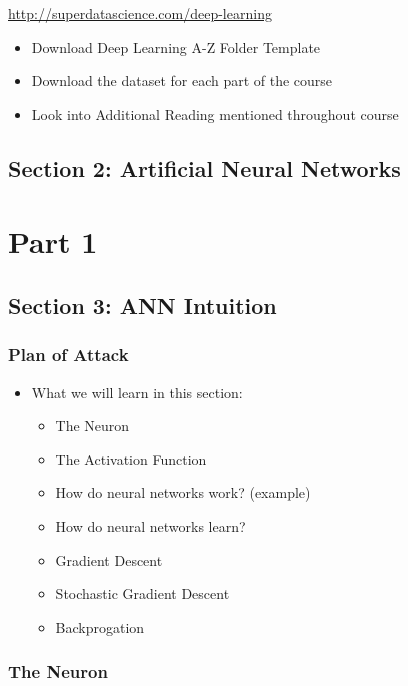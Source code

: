 \documentclass[11pt]{article}
\begin{document}
\url{http://superdatascience.com/deep-learning}

\begin{itemize}
\item Download Deep Learning A-Z Folder Template
\item Download the dataset for each part of the course
\item Look into Additional Reading mentioned throughout course
\end{itemize}

\subsection{Section 2: Artificial Neural Networks}
\label{sec:orgb8c7546}

\section{Part 1}
\label{sec:org360414c}

\subsection{Section 3: ANN Intuition}
\label{sec:orgaba52d8}

\subsubsection{Plan of Attack}
\label{sec:orgbcb8c66}
\begin{itemize}
\item What we will learn in this section:
\begin{itemize}
\item The Neuron
\item The Activation Function
\item How do neural networks work? (example)
\item How do neural networks learn?
\item Gradient Descent
\item Stochastic Gradient Descent
\item Backprogation
\end{itemize}
\end{itemize}

\subsubsection{The Neuron}
\label{sec:org67b617d}
\end{document}
